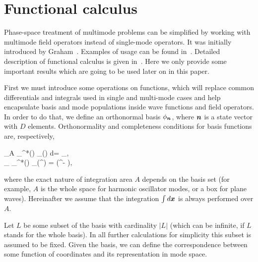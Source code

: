 \section{Functional calculus}

Phase-space treatment of multimode problems can be simplified by working with multimode field operators instead of single-mode operators.
It was initially introduced by Graham~\cite{Graham1970,Graham1970a}.
Examples of usage can be found in~\cite{Steel1998,Norrie2006a}.
Detailed description of functional calculus is given in~\cite{Dalton2011}.
Here we only provide some important results which are going to be used later on in this paper.

First we must introduce some operations on functions, which will replace common differentials and integrals used in single and multi-mode cases and help encapsulate basis and mode populations inside wave functions and field operators.
In order to do that, we define an orthonormal basis $\phi_{\boldsymbol{n}}$, where $\boldsymbol{n}$ is a state vector with $D$ elements.
Orthonormality and completeness conditions for basis functions are, respectively,
\begin{eqns}
	\int\limits_A \phi_{\nvec}^*(\xvec) \phi_{\mvec}(\xvec) d\xvec = \delta_{\nvec\mvec}, \\
	\sum_{\nvec} \phi_{\nvec}^*(\xvec) \phi_{\nvec}(\xvec^\prime) = \delta(\xvec^\prime - \xvec),
\end{eqns}
where the exact nature of integration area $A$ depends on the basis set (for example, $A$ is the whole space for harmonic oscillator modes, or a box for plane waves).
Hereinafter we assume that the integration $\int d\boldsymbol{x}$ is always performed over $A$.

Let $L$ be some subset of the basis with cardinality $|L|$ (which can be infinite, if $L$ stands for the whole basis).
In all further calculations for simplicity this subset is assumed to be fixed.
Given the basis, we can define the correspondence between some function of coordinates and its representation in mode space.

